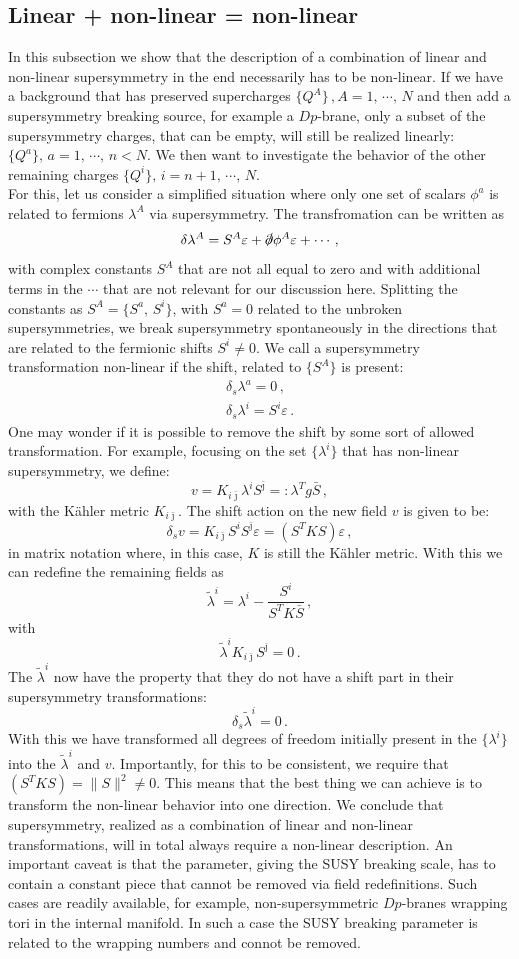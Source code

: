 \documentclass[12pt]{report}
\newcommand{\be}{\begin{equation}}
\newcommand{\ee}{\end{equation}}
\newcommand{\bea}{\begin{equation}\begin{aligned}}
\newcommand{\eea}{\end{aligned}\end{equation}}
\def\jb{{\bar \jmath}}
\begin{document}
\subsection{Linear + non-linear = non-linear}
In this subsection we show that the description of a combination of linear and non-linear supersymmetry in the end necessarily has to be non-linear. If we have a background that has preserved supercharges $\{Q^A\}\,,A =1,\,\cdots,\,N$ and then add a supersymmetry breaking source, for example a $Dp$-brane, only a subset of the supersymmetry charges, that can be empty, will still be realized linearly: $\{Q^a\},\,a=1,\,\cdots,\,n<N$. We then want to investigate the behavior of the other remaining charges $\{Q^i\},\,i=n+1,\,\cdots,\,N$.\\
For this, let us consider a simplified situation where only one set of scalars $\phi^a$ is related to fermions $\lambda^A$ via supersymmetry. The transfromation can be written as
\be 
\delta \lambda^A = S^A \varepsilon + \slashed{\partial}\phi^A \varepsilon + \cdots\,,
\ee
with complex constants $S^A$ that are not all equal to zero and with additional terms in the $\cdots$ that are not relevant for our discussion here. Splitting the constants as $S^A = \{S^a,\,S^i\}$, with $S^a = 0$ related to the unbroken supersymmetries, we break supersymmetry spontaneously in the directions that are related to the fermionic shifts $S^i\neq0$. We call a supersymmetry transformation non-linear if the shift, related to $\{S^A\}$ is present:
\bea 
\delta_s \lambda^a = 0\,,\\
\delta_s \lambda^i = S^i \varepsilon\,.
\eea
One may wonder if it is possible to remove the shift by some sort of allowed transformation. For example, focusing on the set $\{\lambda^i\}$ that has non-linear supersymmetry, we define:
\be 
v=K_{i\jb}\lambda^iS^\jb =: \lambda^T g \bar{S}\,,
\ee
with the Kähler metric $K_{i\jb}$. The shift action on the new field $v$ is given to be:
\be 
\delta_s v = K_{i\jb} S^i S^\jb \varepsilon = \left( S^T K S \right) \varepsilon\,,
\ee
in matrix notation where, in this case, $K$ is still the Kähler metric. With this we can redefine the remaining fields as 
\be 
\tilde{\lambda}^i = \lambda^i - \frac{S^i}{S^T K \bar{S}}\,,
\ee
with 
\be 
\tilde{\lambda}^i K_{i\jb} S^\jb = 0\,.
\ee
The $\tilde{\lambda}^i$ now have the property that they do not have a shift part in their supersymmetry transformations:
\be 
\delta_s \tilde{\lambda}^i = 0\,.
\ee
With this we have transformed all degrees of freedom initially present in the $\{\lambda^i\}$ into the $\tilde{\lambda}^i$ and $v$. Importantly, for this to be consistent, we require that $ \left( S^T K S \right) = \| S \|^2 \neq0$. This means that the best thing we can achieve is to transform the non-linear behavior into one direction. We conclude that supersymmetry, realized as a combination of linear and non-linear transformations, will in total always require a non-linear description. An important caveat is that the parameter, giving the SUSY breaking scale, has to contain a constant piece that cannot be removed via field redefinitions. Such cases are readily available, for example, non-supersymmetric $Dp$-branes wrapping tori in the internal manifold. In such a case the SUSY breaking parameter is related to the wrapping numbers and connot be removed.\\
\end{document}

